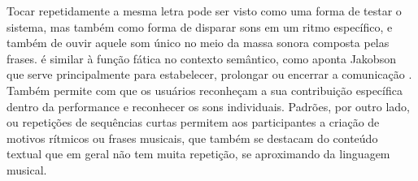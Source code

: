 
Tocar repetidamente a mesma letra pode ser visto como uma forma de testar o sistema, mas também como forma de disparar sons em um ritmo específico, e também de ouvir aquele som único no meio da massa sonora composta pelas frases. é similar à função fática no contexto semântico, como aponta Jakobson que serve principalmente para estabelecer, prolongar ou encerrar a comunicação \cite{Jakobson}. Também permite com que os usuários reconheçam a sua contribuição específica dentro da performance e reconhecer os sons individuais. Padrões, por outro lado, ou repetições de sequências curtas permitem aos participantes a criação de motivos rítmicos ou frases musicais, que também se destacam do conteúdo textual que em geral não tem muita repetição, se aproximando da linguagem musical.


